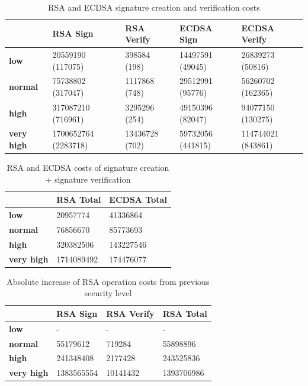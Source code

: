 \documentclass{llncs}
\begin{document}
\begin{table}[]
  \begin{tabular}{|l|l|l|l|l|}
  \hline
                    & \textbf{RSA Sign}    & \textbf{RSA Verify} & \textbf{ECDSA Sign} & \textbf{ECDSA Verify} \\ \hline
  \textbf{low}       & 20559190 (117075)    & 398584 (198)        & 14497591 (49045)    & 26839273 (50816)      \\ \hline
  \textbf{normal}    & 75738802 (317047)    & 1117868 (748)       & 29512991 (95776)    & 56260702 (162365)     \\ \hline
  \textbf{high}      & 317087210 (716961)   & 3295296 (254)       & 49150396 (82047)     & 94077150 (130275)     \\ \hline
  \textbf{very high} & 1700652764 (2283718) & 13436728 (702)      & 59732056 (441815)   & 114744021 (843861)    \\ \hline
  \end{tabular}
  \centering \caption{\label{table:rsa-costs-all-sls} RSA and ECDSA signature creation and verification costs} \end{table}

\begin{table}[]
  \begin{tabular}{|l|l|l|}
  \hline
                     & \textbf{RSA Total} & \textbf{ECDSA Total} \\ \hline
  \textbf{low}       & 20957774           & 41336864             \\ \hline
  \textbf{normal}    & 76856670           & 85773693             \\ \hline
  \textbf{high}      & 320382506          & 143227546            \\ \hline
  \textbf{very high} & 1714089492         & 174476077            \\ \hline
  \end{tabular}
  \centering \caption{\label{table:rsa-costs-all-sls-total} RSA and ECDSA costs of signature creation + signature verification}
\end{table}

\begin{table}[]
  \begin{tabular}{|l|l|l|l|}
  \hline
                     & \textbf{RSA Sign} & \textbf{RSA Verify} & \textbf{RSA Total} \\ \hline
  \textbf{low}       & -                 & -                   & -                  \\ \hline
  \textbf{normal}    & 55179612          & 719284              & 55898896           \\ \hline
  \textbf{high}      & 241348408         & 2177428             & 243525836          \\ \hline
  \textbf{very high} & 1383565554        & 10141432            & 1393706986         \\ \hline
  \end{tabular}
  \centering \caption{\label{table:rsa-absolute-cost-increase} Absolute increase of RSA operation costs from previous security level}
  \end{table}
\end{document}
